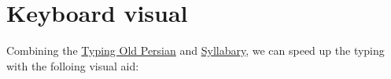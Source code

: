 \documentclass{article}
\begin{document}
     \space\space\space\space\space
     \space\space\space\space\space
     \space\space\space\space\space
     \space\space\space\space\space
     \space\space\space\space\space
     \space\space\space\space\space
     \space\space\space\space\space
     \space\space\space\space\space
     \space\space\space\space\space
     \space\space\space\space\space
     \space\space\space\space\space
     \space\space\space\space\space
     \space\space\space\space\space
     \space\space\space\space\space



    \section{Keyboard visual}

    Combining the \hyperref[Typing Old Persian]{Typing Old Persian} and \hyperref[Syllabary]{Syllabary}, we can speed
    up the typing with the folloing visual aid:
\end{document}
